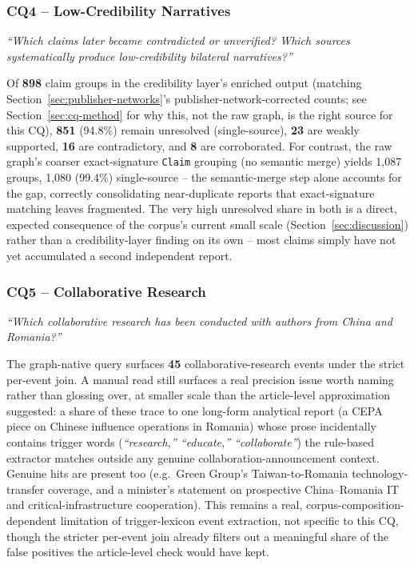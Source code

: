 \documentclass[conference]{IEEEtran}
\begin{document}
\subsubsection{CQ4 -- Low-Credibility Narratives}
\textit{``Which claims later became contradicted or unverified? Which sources systematically produce low-credibility bilateral narratives?''}

Of \textbf{898} claim groups in the credibility layer's enriched output
(matching Section~\ref{sec:publisher-networks}'s publisher-network-corrected
counts; see Section~\ref{sec:cq-method} for why this, not the raw graph, is
the right source for this CQ), \textbf{851} (94.8\%) remain unresolved
(single-source), \textbf{23} are weakly supported, \textbf{16} are
contradictory, and \textbf{8} are corroborated. For contrast, the raw
graph's coarser exact-signature \texttt{Claim} grouping (no semantic merge)
yields 1{,}087 groups, 1{,}080 (99.4\%) single-source -- the semantic-merge
step alone accounts for the gap, correctly consolidating near-duplicate
reports that exact-signature matching leaves fragmented. The very high
unresolved share in both is a direct, expected consequence of the corpus's
current small scale (Section~\ref{sec:discussion}) rather than a
credibility-layer finding on its own -- most claims simply have not yet
accumulated a second independent report.

\subsubsection{CQ5 -- Collaborative Research}
\textit{``Which collaborative research has been conducted with authors from China and Romania?''}

The graph-native query surfaces \textbf{45} collaborative-research events
under the strict per-event join. A manual read still surfaces a real
precision issue worth naming rather than glossing over, at smaller scale
than the article-level approximation suggested: a share of these trace to
one long-form analytical report (a CEPA piece on Chinese influence
operations in Romania) whose prose incidentally contains trigger words
(\emph{``research,'' ``educate,'' ``collaborate''}) the rule-based
extractor matches outside any genuine collaboration-announcement context.
Genuine hits are present too (e.g.\ Green Group's Taiwan-to-Romania
technology-transfer coverage, and a minister's statement on prospective
China--Romania IT and critical-infrastructure cooperation). This remains a
real, corpus-composition-dependent limitation of trigger-lexicon event
extraction, not specific to this CQ, though the stricter per-event join
already filters out a meaningful share of the false positives the
article-level check would have kept.
\end{document}
